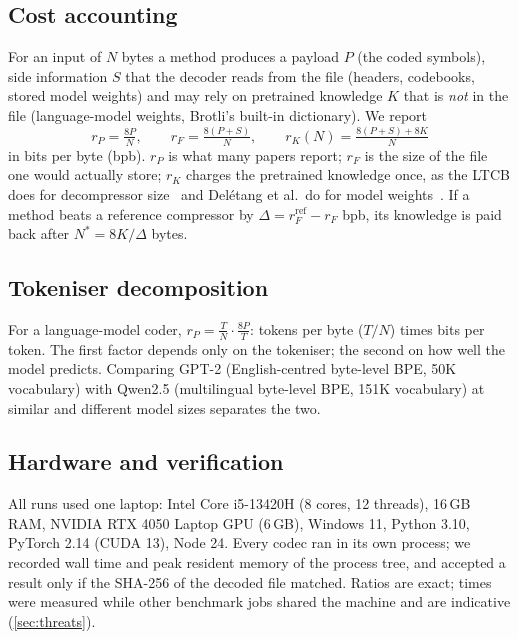 \documentclass[conference]{IEEEtran}
\begin{document}


\subsection{Cost accounting}\label{sec:cost}
For an input of $N$ bytes a method produces a payload $P$ (the coded symbols), side information $S$ that the decoder reads from the file (headers, codebooks, stored model weights) and may rely on pretrained knowledge $K$ that is \emph{not} in the file (language-model weights, Brotli's built-in dictionary). We report
\begin{equation}
r_P = \tfrac{8P}{N},\qquad r_F = \tfrac{8(P+S)}{N},\qquad r_K(N) = \tfrac{8(P+S)+8K}{N}
\end{equation}
in bits per byte (bpb). $r_P$ is what many papers report; $r_F$ is the size of the file one would actually store; $r_K$ charges the pretrained knowledge once, as the LTCB does for decompressor size~\cite{mahoney_ltcb} and Del\'etang et al.\ do for model weights~\cite{deletang2024lmic}. If a method beats a reference compressor by $\Delta = r_F^{\text{ref}} - r_F$ bpb, its knowledge is paid back after $N^\ast = 8K/\Delta$ bytes.

\subsection{Tokeniser decomposition}\label{sec:script}
For a language-model coder, $r_P = \frac{T}{N}\cdot\frac{8P}{T}$: tokens per byte ($T/N$) times bits per token. The first factor depends only on the tokeniser; the second on how well the model predicts. Comparing GPT-2 (English-centred byte-level BPE, 50K vocabulary) with Qwen2.5 (multilingual byte-level BPE, 151K vocabulary) at similar and different model sizes separates the two.

\subsection{Hardware and verification}
All runs used one laptop: Intel Core i5-13420H (8 cores, 12 threads), 16\,GB RAM, NVIDIA RTX 4050 Laptop GPU (6\,GB), Windows 11, Python 3.10, PyTorch 2.14 (CUDA 13), Node 24. Every codec ran in its own process; we recorded wall time and peak resident memory of the process tree, and accepted a result only if the SHA-256 of the decoded file matched. Ratios are exact; times were measured while other benchmark jobs shared the machine and are indicative (\cref{sec:threats}).
\end{document}
